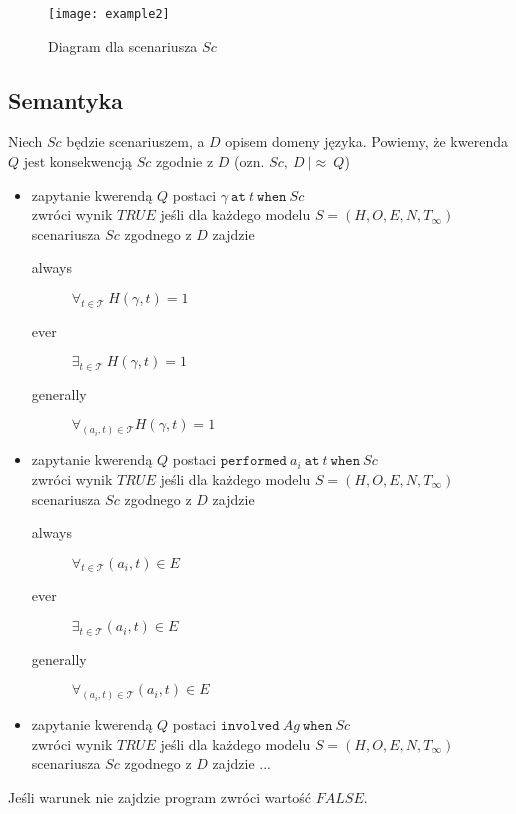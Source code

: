 \begin{figure}[h!]
	\centering
	\texttt{[image: example2]}
	\caption{Diagram dla scenariusza $Sc$}
	\label{PicSC4}
\end{figure}

\subsection{Semantyka}
Niech $Sc$ będzie scenariuszem, a $D$ opisem domeny języka. Powiemy, że kwerenda $Q$ jest konsekwencją
$Sc$ zgodnie z $D$ (ozn. $Sc,\ D\ |\approx\ Q $)

\begin{itemize}
	\item zapytanie kwerendą $Q$ postaci $\gamma\ \texttt{at}\ t\ \texttt{when}\ Sc$\\ zwróci wynik
	$TRUE$ jeśli dla każdego modelu $S=(H,O,E,N,T_{\infty})$ scenariusza $Sc$ zgodnego z $D$ zajdzie\\
	\begin{description}
		\item[always] $\forall_{t \in \mathcal{T}}\ H(\gamma,t)=1$
		\item[ever] $\exists_{t \in \mathcal{T}}\ H(\gamma,t)=1$
		\item[generally] $\forall_{(a_i,t)\in \mathcal{T}} H(\gamma,t)=1$
	\end{description}
	\item zapytanie kwerendą $Q$ postaci $\texttt{performed}\ a_i\ \texttt{at}\ t\ \texttt{when}\ Sc$\\
	zwróci wynik $TRUE$ jeśli dla każdego modelu $S=(H,O,E,N,T_{\infty})$ scenariusza $Sc$ zgodnego z $D$ zajdzie
	\begin{description}
		\item[always] $\forall_{t \in \mathcal{T}} (a_i,t) \in E$
		\item[ever] $\exists_{t \in \mathcal{T}} (a_i,t) \in E$
		\item[generally] $\forall_{(a_i,t)\in \mathcal{T}} (a_i,t) \in E$
	\end{description}
	\item zapytanie kwerendą $Q$ postaci $\texttt{involved}\ Ag\ \texttt{when}\ Sc$\\ zwróci wynik $TRUE$
	jeśli dla każdego modelu $S=(H,O,E,N,T_{\infty})$ scenariusza $Sc$ zgodnego z $D$ zajdzie ...
\end{itemize}

\begin{remark}
   Jeśli warunek nie zajdzie program zwróci wartość $FALSE$.
\end{remark}

